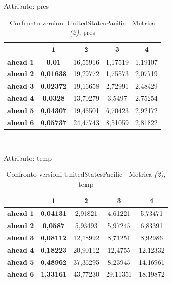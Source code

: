 \documentclass[12pt,a4paper,oneside,openright]{book}
\begin{document}
\medskip

Attributo: pres \\ 

\begin{table}[H]
\centering
\begin{tabular}{|c|c|c|c|c|}
\hline
& 1 & 2 & 3 & 4 \\
\hline
\textbf{ahead 1} & \textbf{0,01} & 16,55916 & 1,17519 & 1,19107\\
\hline
\textbf{ahead 2} & \textbf{0,01638} & 19,29772 & 1,75573 & 2,07719\\
\hline
\textbf{ahead 3} & \textbf{0,02372} & 19,16658 & 2,72991 & 2,48429\\
\hline
\textbf{ahead 4} & \textbf{0,0328} & 13,70279 & 3,5497 & 2,75254\\
\hline
\textbf{ahead 5} & \textbf{0,04307} & 19,46501 & 6,70423 & 2,92172\\
\hline
\textbf{ahead 6} & \textbf{0,05737} & 24,47743 & 8,51059 & 2,81822\\
\hline
\end{tabular} \\
\caption{Confronto versioni UnitedStatesPacific - Metrica \textit{(2)}, pres}
\end{table} 

\medskip

Attributo: temp \\ 

\begin{table}[H]
\centering
\begin{tabular}{|c|c|c|c|c|}
\hline
& 1 & 2 & 3 & 4 \\
\hline
\textbf{ahead 1} & \textbf{0,04131} & 2,91821 & 4,61221 & 5,73471\\
\hline
\textbf{ahead 2} & \textbf{0,0587} & 5,93493 & 5,97245 & 6,83391\\
\hline
\textbf{ahead 3} & \textbf{0,08112} & 12,18992 & 8,71251 & 8,92986\\
\hline
\textbf{ahead 4} & \textbf{0,18223} & 20,90112 & 12,4755 & 12,12332\\
\hline
\textbf{ahead 5} & \textbf{0,48962} & 37,36295 & 8,23943 & 14,16961\\
\hline
\textbf{ahead 6} & \textbf{1,33161} & 43,77230 & 29,11351 & 18,19872\\
\hline
\end{tabular} \\
\caption{Confronto versioni UnitedStatesPacific - Metrica \textit{(2)}, temp}
\end{table} 
\end{document}

